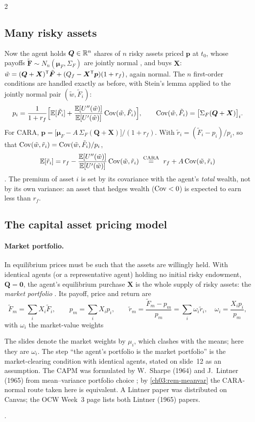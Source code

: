 \begin{paracol}{2}
\subsection{Many risky assets}
Now the agent holds $\bm Q\in\mathbb{R}^n$ shares of $n$ risky assets priced $\bm p$ at $t_0$, whose payoffs
$\tilde{\bm F}\sim N_n(\bm\mu_F,\Sigma_F)$ are jointly normal , and buys $\bm X$:
$\tilde w=(\bm Q+\bm X)^{\mathsf T}\tilde{\bm F}+(Q_f-\bm X^{\mathsf T}\bm p)(1+r_f)$, again normal. The $n$ first-order conditions are handled
exactly as before, with Stein's lemma applied to the jointly normal pair $(\tilde w,\tilde F_i)$:
\[
  p_i=\frac{1}{1+r_f}\Bigl[\mathbb{E}[\tilde F_i]+\frac{\mathbb{E}[U''(\tilde w)]}{\mathbb{E}[U'(\tilde w)]}\operatorname{Cov}(\tilde w,\tilde F_i)\Bigr],\qquad
  \operatorname{Cov}(\tilde w,\tilde F_i)=\bigl[\Sigma_F(\bm Q+\bm X)\bigr]_i .
\]
For CARA, $\bm p=\bigl[\bm\mu_F-A\,\Sigma_F(\bm Q+\bm X)\bigr]/(1+r_f)$. With $\tilde r_i=(\tilde F_i-p_i)/p_i$, so that
$\operatorname{Cov}(\tilde w,\tilde r_i)=\operatorname{Cov}(\tilde w,\tilde F_i)/p_i$,
\[
  \mathbb{E}[\tilde r_i]=r_f-\frac{\mathbb{E}[U''(\tilde w)]}{\mathbb{E}[U'(\tilde w)]}\operatorname{Cov}(\tilde w,\tilde r_i)\ \overset{\text{CARA}}{=}\ r_f+A\operatorname{Cov}(\tilde w,\tilde r_i)
\]
. The premium of asset $i$ is set by its covariance with the agent's \emph{total} wealth, not by its
own variance: an asset that hedges wealth ($\operatorname{Cov}<0$) is expected to earn less than $r_f$.

\subsection{The capital asset pricing model}
\paragraph{Market portfolio.} In equilibrium prices must be such that the assets are willingly held. With
identical agents (or a representative agent) holding no initial risky endowment, $\bm Q=\bm0$, the agent's
equilibrium purchase $\bm X$ is the whole supply of risky assets: the \emph{market portfolio}
. Its payoff, price and return are
\[
  \tilde F_m=\sum_iX_i\tilde F_i,\qquad p_m=\sum_iX_ip_i,\qquad
  \tilde r_m=\frac{\tilde F_m-p_m}{p_m}=\sum_i\omega_i\tilde r_i,\quad \omega_i=\frac{X_ip_i}{p_m},
\]
with $\omega_i$ the market-value weights \begin{coursenote}
The slides denote the market weights by $\mu_i$, which clashes with the means; here they are $\omega_i$. The step
``the agent's portfolio is the market portfolio'' is the market-clearing condition with identical agents,
stated on slide~12 as an assumption. The CAPM was formulated by W.~Sharpe (1964) and J.~Lintner (1965) from
mean--variance portfolio choice ; by \cref{ch03:rem-meanvar} the CARA-normal route taken here is
equivalent. A Lintner paper was distributed on Canvas; the OCW Week~3 page lists both Lintner (1965) papers.
\end{coursenote}.


\end{paracol}
